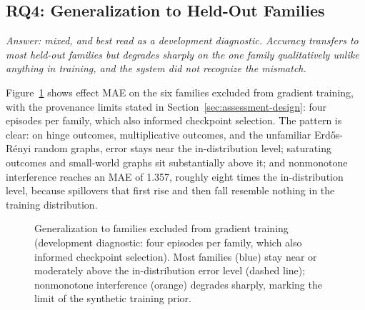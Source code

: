 \documentclass[electronics,article,submit,oneauthor]{Definitions/mdpi}
\begin{document}
\subsection{RQ4: Generalization to Held-Out Families}\label{sec:assessment-rq4}

\emph{Answer: mixed, and best read as a development diagnostic. Accuracy transfers to most held-out families but degrades sharply on the one family qualitatively unlike anything in training, and the system did not recognize the mismatch.}

Figure~\ref{fig:rq4} shows effect MAE on the six families excluded from gradient training, with the provenance limits stated in Section~\ref{sec:assessment-design}: four episodes per family, which also informed checkpoint selection. The pattern is clear: on hinge outcomes, multiplicative outcomes, and the unfamiliar Erd\H{o}s-R\'enyi random graphs, error stays near the in-distribution level; saturating outcomes and small-world graphs sit substantially above it; and nonmonotone interference reaches an MAE of 1.357, roughly eight times the in-distribution level, because spillovers that first rise and then fall resemble nothing in the training distribution.

\begin{figure}[!t]
\centering
{}
\caption{Generalization to families excluded from gradient training (development diagnostic: four episodes per family, which also informed checkpoint selection). Most families (blue) stay near or moderately above the in-distribution error level (dashed line); nonmonotone interference (orange) degrades sharply, marking the limit of the synthetic training prior.}
\label{fig:rq4}
\end{figure}
\end{document}
